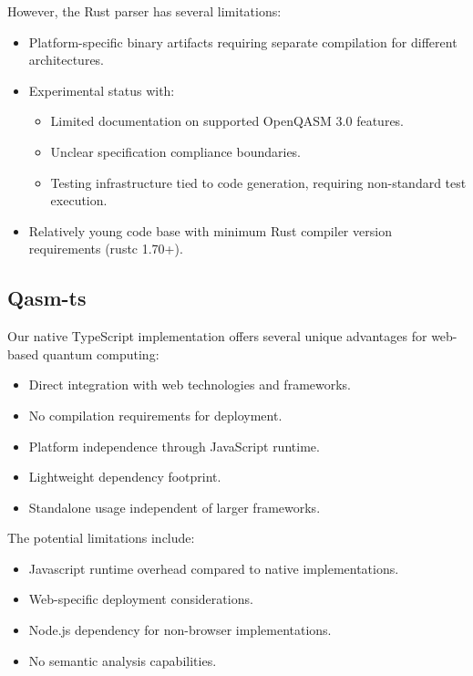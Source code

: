 \documentclass{article}
\begin{document}
\noindent However, the Rust parser has several limitations: 

\begin{itemize}
    \item Platform-specific binary artifacts requiring separate compilation for different architectures.
    \item Experimental status with:
    \begin{itemize}
        \item Limited documentation on supported OpenQASM 3.0 features.
        \item Unclear specification compliance boundaries.
        \item Testing infrastructure tied to code generation, requiring non-standard test execution.
    \end{itemize}
    \item Relatively young code base with minimum Rust compiler version requirements (rustc 1.70+).
\end{itemize}

\subsection{Qasm-ts}

Our native TypeScript implementation offers several unique advantages for web-based quantum computing:

\begin{itemize}
    \item Direct integration with web technologies and frameworks.
    \item No compilation requirements for deployment.
    \item Platform independence through JavaScript runtime.
    \item Lightweight dependency footprint.
    \item Standalone usage independent of larger frameworks.
\end{itemize}

\noindent The potential limitations include:

\begin{itemize}
    \item Javascript runtime overhead compared to native implementations.
    \item Web-specific deployment considerations.
    \item Node.js dependency for non-browser implementations.
    \item No semantic analysis capabilities.
\end{itemize}
\end{document}
